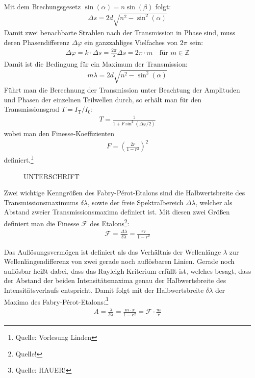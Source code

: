 \documentclass[11pt, a4paper]{article}
\begin{document}
Mit dem Brechungsgesetz $\sin(\alpha) = n \sin(\beta)$ folgt:
\begin{align}
	\Delta s = 2 d \sqrt{n^2 - \sin^2(\alpha)}
\end{align}
Damit zwei benachbarte Strahlen nach der Transmission in Phase sind, muss deren Phasendifferenz $\Delta \varphi$ ein ganzzahliges Vielfaches von $2\pi$ sein:
\begin{align}
	\Delta \varphi = k \cdot \Delta s = \frac{2\pi}{\lambda} \Delta s = 2 \pi \cdot m \quad \text{für } m \in \mathbb{Z}
\end{align}
Damit ist die Bedingung für ein Maximum der Transmission:
\begin{align}
	m \lambda = 2 d \sqrt{n^2 - \sin^2(\alpha)}
\end{align}
Führt man die Berechnung der Transmission unter Beachtung der Amplituden und Phasen der einzelnen Teilwellen durch, so erhält man für den Transmissionsgrad $T = I_\mathrm{T} / I_0$:
\begin{align}
	T = \frac{1}{1 + F \sin^2(\Delta \varphi / 2)}
\end{align}
wobei man den Finesse-Koeffizienten
\begin{align}
	F = \left( \frac{2 r}{1 - r^2} \right)^2
\end{align}
definiert.\footnote{Quelle: Vorlesung Linden}

\begin{figure}[h]
	\centering
	
	\caption{UNTERSCHRIFT}
	\label{fig:fabry_transmission}
\end{figure}

Zwei wichtige Kenngrößen des Fabry-Pérot-Etalons sind die Halbwertsbreite des Transmissionsmaximums $\delta \lambda$, sowie der freie Spektralbereich $\Delta \lambda$, welcher als Abstand zweier Transmissionsmaxima definiert ist.
Mit diesen zwei Größen definiert man die Finesse $\mathcal{F}$ des Etalons\footnote{Quelle!}:
\begin{align}
	\mathcal{F} = \frac{\Delta \lambda}{\delta \lambda} = \frac{\pi r}{1 - r^2}
\end{align}

Das Auflösungsvermögen ist definiert als das Verhältnis der Wellenlänge $\lambda$ zur Wellenlängendifferenz von zwei gerade noch auflösbaren Linien.
Gerade noch auflösbar heißt dabei, dass das Rayleigh-Kriterium erfüllt ist, welches besagt, dass der Abstand der beiden Intensitätsmaxima genau der Halbwertsbreite des Intensitätsverlaufs entspricht.
Damit folgt mit der Halbwertsbreite $\delta \lambda$ der Maxima des Fabry-Pérot-Etalons:\footnote{Quelle: HAUER!}
\begin{align}
	A = \frac{\lambda}{\delta \lambda} = \frac{m \cdot \pi}{1 - r^2} = \mathcal{F} \cdot \frac{m}{r}
\end{align}
\end{document}
